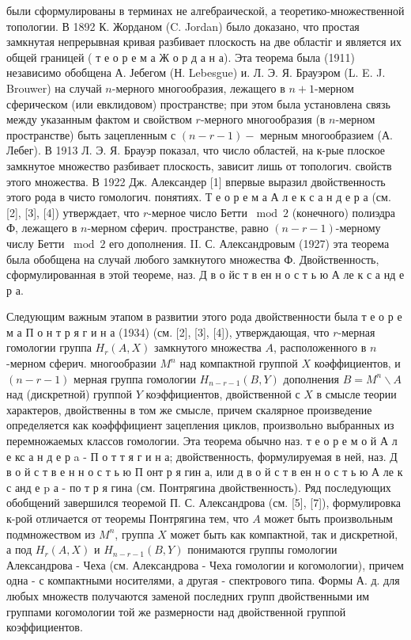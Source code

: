 \documentclass[10pt]{article}
\begin{document}
были сформулированы в терминах не алгебраической, а теоретико-множественной топологии. В 1892 К. Жорданом (C. Jordan) было доказано, что простая замкнутая непрерывная кривая разбивает плоскость на две областіг и является их общей границей ( т е о р е м а Ж о р д а н а). Эта теорема была (1911) независимо обобщена А. Јебегом (Н. Lebesgue) и. Л. Э. Я. Брауэром (L. E. J. Brouwer) на случай $n$-мерного многообразия, лежащего в $n+1$-мерном сферическом (или евклидовом) пространстве; при этом была установлена связь между указанным фактом и свойством $r$-мерного многообразия (в $n$-мерном пространстве) быть зацепленным с $(n-r-1)-$ мерным многообразием (А. Лебег). В 1913 Л. Э. Я. Брауэр показал, что число областей, на к-рые плоское замкнутое множество разбивает плоскость, зависит лишь от топологич. свойств этого множества. В 1922 Дж. Александер [1] впервые выразил двойственность этого рода в чисто гомологич. понятиях. Т е о р е м а А л е к с а н д е р а (см. [2], [3], [4]) утверждает, что $r$-мерное число Бетти $\bmod 2$ (конечного) полиэдра Ф, лежащего в $n$-мерном сферич. пространстве, равно $(n-r-1)$-мерному числу Бетти $\bmod 2$ его дополнения. II. С. Александровым (1927) эта теорема была обобщена на случай любого замкнутого множества Ф. Двойственность, сформулированная в этой теореме, наз. Д в о йс т в ен н о с т ь ю А ле к с а нд е р а.



Следующим важным этапом в развитии этого рода двойственности была т е о р е м а П о н т р я г и н а (1934) (см. [2], [3], [4]), утверждающая, что $r$-мерная гомологии группа $H_{r}(A, X)$ замкнутого множества $A$, расположенного в $n$-мерном сферич. многообразии $M^{n}$ над компактной группой $X$ коәффициентов, и $(n-r-1)$ мерная группа гомологии $H_{n-r-1}(B, Y)$ дополнения $B=M^{n} \backslash A$ над (дискретной) группой $Y$ коэффициентов, двойственной с $X$ в смысле теории характеров, двойственны в том же смысле, причем скалярное произведение определяется как коәфффициент зацепления циклов, произвольно выбранных из перемножаемых классов гомологии. Эта теорема обычно наз. т е о р е м о й А л е кс а н д е р a - П о т т я г и н а; двойственность, формулируемая в ней, наз. Д в о й с т в е н н о с т ь ю П онт р я гин а, или д в о й с т в ен н о с т ь ю А ле к с анд е $\mathrm{p}$ а - по т р я гина (см. Понтрягина двойственность). Ряд последующих обобщений завершился теоремой П. С. Александрова (см. [5], [7]), формулировка к-рой отличается от теоремы Понтрягина тем, что $A$ может быть произвольным подмножеством из $M^{n}$, группа $X$ может быть как компактной, так и дискретной, а под $H_{r}(A, X)$ и $H_{n-r-1}(B, Y)$ понимаются группы гомологии Александрова - Чеха (см. Александрова - Чеха гомологии и когомологии), причем одна - с компактными носителями, а другая - спектрового типа. Формы А. д. для любых множеств получаются заменой последних групп двойственными им группами когомологии той же размерности над двойственной группой коэффициентов.
\end{document}
